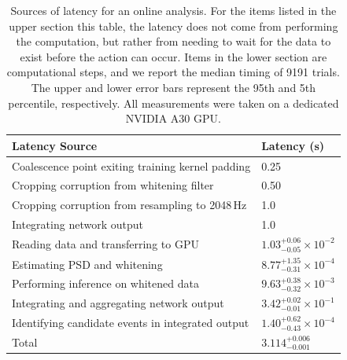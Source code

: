\begin{refsection}
\begin{table}
\centering
\setlength\tabcolsep{8pt}
\begin{tabular*}{\columnwidth}{ p{10cm} p{3.5cm} }
\hline
\hline
Latency Source & Latency (s)\\
\hline
Coalescence point exiting training kernel padding & 0.25\\
Cropping corruption from whitening filter & 0.50\\
Cropping corruption from resampling to 2048\,Hz & 1.0\\
Integrating network output & 1.0\\
\hline
Reading data and transferring to GPU & $1.03^{+0.06}_{-0.05} \times 10^{-2}$\\
Estimating PSD and whitening & $8.77^{+1.35}_{-0.31} \times 10^{-4}$\\
Performing inference on whitened data & $9.63^{+0.38}_{-0.32} \times 10^{-3}$\\
Integrating and aggregating network output & $3.42^{+0.02}_{-0.01} \times 10^{-1}$\\
Identifying candidate events in integrated output & $1.40^{+0.62}_{-0.43} \times 10^{-4}$\\
\hline

Total & $3.114^{+0.006}_{-0.001}$\\
\hline
\hline
\end{tabular*}
\caption[Sources of latency for an \aframe online analysis]{Sources of latency for an \aframe online analysis. 
For the items listed in the upper section this table, the latency does not come from performing the computation, but rather from needing to wait for the data to exist before the action can occur. 
Items in the lower section are computational steps, and we report the median timing of 9191 trials. 
The upper and lower error bars represent the 95th and 5th percentile, respectively. 
All measurements were taken on a dedicated NVIDIA A30 GPU.}
\label{aframe_meth_tab:latency}
\end{table}



\end{refsection}

